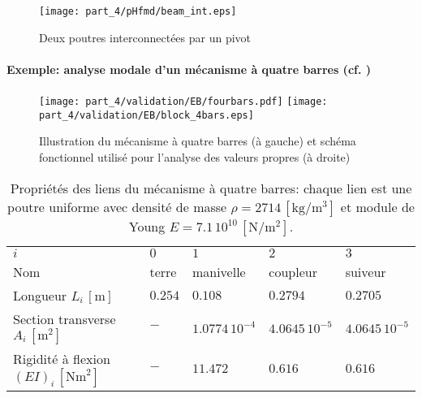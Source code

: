 \begin{figure}[t]
	\centering
	\texttt{[image: part\_4/pHfmd/beam\_int.eps]} 
	\caption{Deux poutres interconnectées par un pivot}
	\label{fig:beam_int_fr}
\end{figure}

\paragraph{Exemple: analyse modale d'un mécanisme à quatre barres (cf. )}

\begin{figure}[tb]
	\centering
	\texttt{[image: part\_4/validation/EB/fourbars.pdf]} 
	\hspace{.3cm}
	\texttt{[image: part\_4/validation/EB/block\_4bars.eps]} 
	\caption{Illustration du mécanisme à quatre barres (à gauche) et schéma fonctionnel utilisé pour l'analyse des valeurs propres (à droite)}
	\label{fig:4bars_fr}
\end{figure}

\begin{table}[bt]
	\centering
	\caption{Propriétés des liens du mécanisme à quatre barres: chaque lien est une poutre uniforme avec  densité de masse $\rho=2714\,[\mathrm{kg}/\mathrm{m}^3]$ et module de Young $E=7.1\,10^{10}\,[\mathrm{N}/\mathrm{m}^2]$. }
	\label{tab:data_4bars_fr}       %
	\begin{tabular}{lllll}
		\hline\noalign{\smallskip}
		$i$ & $0$ &  $1$ &  $2$ &  $3$  \\
		\noalign{\smallskip}\hline\noalign{\smallskip}
		Nom & terre & manivelle & coupleur & suiveur \\ 
		Longueur $L_i\,[\mathrm{m}]$ & $0.254$ & $0.108$ & $0.2794$ & $0.2705$\\
		Section transverse $A_i\,[\mathrm{m}^2]$ & $-$ & $1.0774\,10^{-4}$ & $4.0645\,10^{-5}$ & $4.0645\,10^{-5}$ \\
		Rigidité à flexion $(EI)_i\,[\mathrm{Nm}^2]$ & $-$ & $11.472$ & $0.616$ & $0.616$ \\
		\hline
	\end{tabular}
\end{table}

